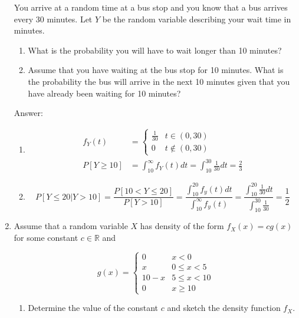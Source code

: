 \documentclass{article}
\begin{document}
\begin{enumerate}
You arrive at a random time at a bus stop and you know that a bus arrives every 30 minutes. Let $Y$ be the random variable describing your wait time in minutes. 

\begin{enumerate}

\item
What is the probability you will have to wait longer than 10 minutes?

\item
Assume that you have waiting at the bus stop for 10 minutes. What is the probability the bus will arrive in the next 10 minutes given that you have already been waiting for 10 minutes?
\end{enumerate}

Answer:

\begin{enumerate}
\item
\begin{align*}
f_Y(t) &= \begin{cases}
		\frac{1}{30} & t \in (0,30) \\
		0 & t \notin (0,30)
		\end{cases} \\
P[Y \geq 10] &= \int_{10}^\infty f_Y(t)  dt = \int_{10}^{30} \frac{1}{30} dt = \boxed{\frac{2}{3}}
\end{align*}

\item
$$
P[Y \leq 20 | Y > 10] = \frac{P[10 < Y \leq 20]}{P[Y > 10]}
= \frac{\int_{10}^{20} f_y(t) dt}{\int_{10}^\infty f_y(t)}
= \frac{\int_{10}^{20} \frac{1}{30} dt}{\int_{10}^{30} \frac{1}{30}} = \boxed{\frac{1}{2}}
$$

\end{enumerate}

\item
Assume that a random variable $X$ has density of the form $f_X(x) = cg(x)$ for some constant $c \in \mathbb{R}$ and 

$$
g(x) =
	\begin{cases}
	0 & x < 0 \\
	x & 0 \leq x < 5 \\
	10-x & 5 \leq x < 10 \\
	0 & x \geq 10
	\end{cases}
$$

\begin{enumerate}
\item 
Determine the value of the constant $c$ and sketch the density function $f_X$. 


\end{enumerate}
\end{enumerate}
\end{document}
